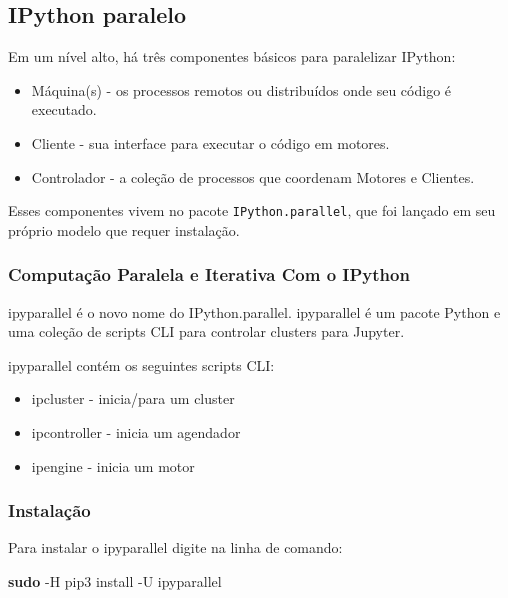 \documentclass[11pt]{article}
\providecommand{\tightlist}{%
      \setlength{\itemsep}{0pt}\setlength{\parskip}{0pt}}
\newenvironment{Shaded}{}{}
\newcommand{\KeywordTok}[1]{\textcolor[rgb]{0.00,0.44,0.13}{\textbf{{#1}}}}
\newcommand{\NormalTok}[1]{{#1}}
\begin{document}
    \subsection{IPython paralelo}\label{ipython-paralelo}

Em um nível alto, há três componentes básicos para paralelizar IPython:

\begin{itemize}
\tightlist
\item
  Máquina(s) - os processos remotos ou distribuídos onde seu código é
  executado.
\item
  Cliente - sua interface para executar o código em motores.
\item
  Controlador - a coleção de processos que coordenam Motores e Clientes.
\end{itemize}

Esses componentes vivem no pacote \texttt{IPython.parallel}, que foi
lançado em seu próprio modelo que requer instalação.

\subsubsection{Computação Paralela e Iterativa Com o
IPython}\label{computauxe7uxe3o-paralela-e-iterativa-com-o-ipython}

ipyparallel é o novo nome do IPython.parallel. ipyparallel é um pacote
Python e uma coleção de scripts CLI para controlar clusters para
Jupyter.

ipyparallel contém os seguintes scripts CLI:

\begin{itemize}
\tightlist
\item
  ipcluster - inicia/para um cluster
\item
  ipcontroller - inicia um agendador
\item
  ipengine - inicia um motor
\end{itemize}

\subsubsection{Instalação}\label{instalauxe7uxe3o}

Para instalar o ipyparallel digite na linha de comando:

\begin{Shaded}
\begin{Highlighting}[]
    \KeywordTok{sudo} \NormalTok{-H pip3 install -U ipyparallel}
\end{Highlighting}
\end{Shaded}
\end{document}
